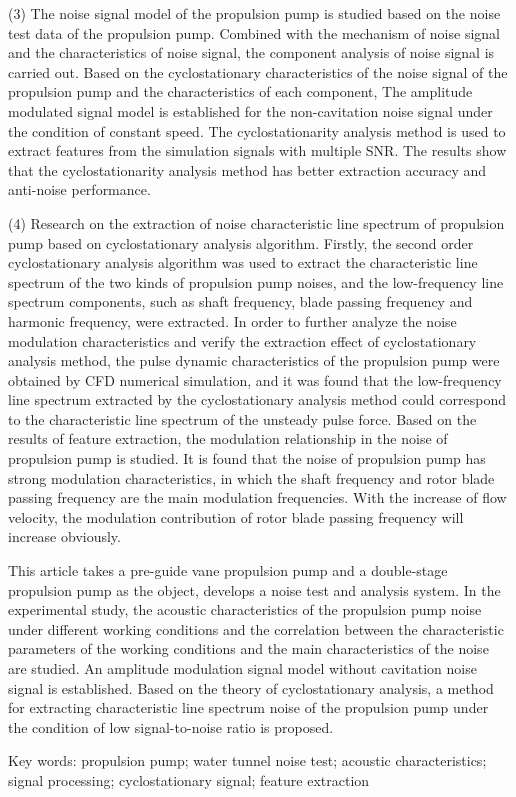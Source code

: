 (3) 
The noise signal model of the propulsion pump is studied based on the noise test data of the propulsion pump. 
Combined with the mechanism of noise signal and the characteristics of noise signal, the component analysis of noise signal is carried out.
Based on the cyclostationary characteristics of the noise signal of the propulsion pump and the characteristics of each component, 
The amplitude modulated signal model is established for the non-cavitation noise signal 
under the condition of constant speed. 
The cyclostationarity analysis method is used to extract features 
from the simulation signals with multiple SNR. 
The results show that the cyclostationarity analysis method
has better extraction accuracy and anti-noise performance.

(4) 
Research on the extraction of noise characteristic line spectrum of propulsion pump based on cyclostationary analysis algorithm.
Firstly, the second order cyclostationary analysis algorithm was used to extract the characteristic line spectrum of the two kinds of propulsion pump noises, 
and the low-frequency line spectrum components, such as shaft frequency, blade passing frequency and harmonic frequency, were extracted. 
In order to further analyze the noise modulation characteristics and verify the extraction effect of cyclostationary analysis method,
 the pulse dynamic characteristics of the propulsion pump were obtained by CFD numerical simulation, 
 and it was found that the low-frequency line spectrum extracted by the cyclostationary analysis method could correspond to the characteristic line spectrum of the unsteady pulse force. 
 Based on the results of feature extraction, 
 the modulation relationship in the noise of propulsion pump is studied. 
 It is found that the noise of propulsion pump has strong modulation characteristics, 
 in which the shaft frequency and rotor blade passing frequency are the main modulation frequencies. 
 With the increase of flow velocity, the modulation contribution of rotor blade passing frequency will increase obviously.

 This article takes a pre-guide vane propulsion pump and a double-stage propulsion pump as the object, 
 develops a noise test and analysis system.
 In the experimental study, the acoustic characteristics of the propulsion pump noise under different working conditions 
 and the correlation between the characteristic parameters of the working conditions and the main characteristics of the noise are studied. 
 An amplitude modulation signal model without cavitation noise signal is established. 
 Based on the theory of cyclostationary analysis, a method for extracting characteristic line spectrum noise of the propulsion pump under the condition of low signal-to-noise ratio is proposed.

 \quad

Key words: propulsion pump; water tunnel noise test; acoustic characteristics; signal processing; 
cyclostationary signal; feature extraction